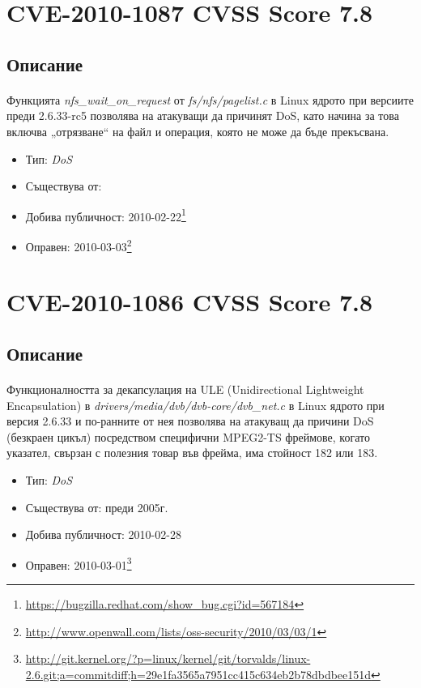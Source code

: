 \documentclass[a4paper,12pt,leqno]{article}
\begin{document}
\section{CVE-2010-1087 CVSS Score 7.8}
\subsection{Описание}
\paragraph{}
Функцията \textit{nfs\_wait\_on\_request} от \textit{fs/nfs/pagelist.c} в Linux ядрото при версиите 
преди 2.6.33-rc5 позволява на атакуващи да причинят DoS, като начина за 
това включва  „отрязване“ на файл и операция, която не може да бъде 
прекъсвана. 

\begin{itemize}
    \item Тип: \textit{DoS}
    \item Съществува от:
  	\item Добива публичност: 2010-02-22\footnote{\url{https://bugzilla.redhat.com/show_bug.cgi?id=567184}}
    \item Оправен: 2010-03-03\footnote{\url{http://www.openwall.com/lists/oss-security/2010/03/03/1}}
\end{itemize}


\section{CVE-2010-1086 CVSS Score 7.8}
\subsection{Описание}
\paragraph{}
Функционалността за декапсулация на ULE (Unidirectional Lightweight 
Encapsulation)
 в \textit{drivers/media/dvb/dvb-core/dvb\_net.c} в Linux ядрото при 
версия 2.6.33 и по-ранните от нея позволява на атакуващ да причини DoS 
(безкраен цикъл) посредством специфични MPEG2-TS фреймове, когато 
указател, свързан с полезния товар във фрейма, има стойност 182 или 183.

\begin{itemize}
    \item Тип: \textit{DoS}
    \item Съществува от: преди 2005г.
  	\item Добива публичност: 2010-02-28
    \item Оправен: 2010-03-01\footnote{\url{http://git.kernel.org/?p=linux/kernel/git/torvalds/linux-2.6.git;a=commitdiff;h=29e1fa3565a7951cc415c634eb2b78dbdbee151d}}
\end{itemize}
\end{document}
